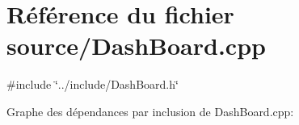 \hypertarget{a00039}{
\section{Référence du fichier source/DashBoard.cpp}
\label{a00039}
}
{\ttfamily \#include \char`\"{}../include/DashBoard.h\char`\"{}}\par
Graphe des dépendances par inclusion de DashBoard.cpp:
